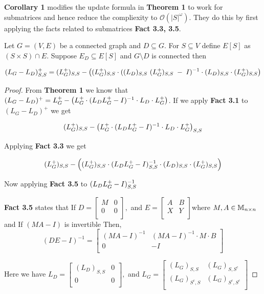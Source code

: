 \textbf{Corollary 1} modifies the update formula in \textbf{Theorem 1} to work for submatrices and hence reduce the compliexity to $\mathcal{O}(|S|^{\omega})$. They do this by first applying the facts related to submatrices \textbf{Fact 3.3, 3.5}. 
\begin{HXc}
  Let $G=(V,E)$ be a connected graph and $D \subseteq G$. For $S \subseteq V$ define $ E[S] $ as $(S \times S) \cap E$. Suppose $E_D \subseteq E[S]$ and  $G \setminus D$ is connected then 
  
  $$ (L_G - L_D)_{S,S}^+ = (L_{G}^{+})_{S,S} - \left( (L_{G}^{+})_{S,S} \cdot ((L_D)_{S,S} \  (L_{G}^{+})_{S,S} \; - \; I)^{-1} \cdot (L_D)_{S,S} \cdot (L_{G}^{+})_{S,S} \right) $$ 
  
\end{HXc}
\begin{proof}
From \textbf{Theorem 1} we know that $(L_G - L_D)^+ = L_{G}^{+} - \left( L_{G}^{+} \cdot (L_DL_{G}^{+}-I)^{-1} \cdot L_D \cdot L_{G}^{+}\right)$. If we apply \textbf{Fact 3.1} to $(L_G - L_D)^+$ we get 

$$ (L_{G}^{+})_{S,S} - \left( L_{G}^{+} \cdot (L_DL_{G}^{+}-I)^{-1} \cdot L_D \cdot L_{G}^{+} \right)_{S,S} $$

Applying \textbf{Fact 3.3} we get 

$$(L_{G}^{+})_{S,S} - \left( (L_{G}^{+})_{S,S} \cdot (L_DL_{G}^{+}-I)^{-1}_{S,S} \cdot (L_D)_{S,S} \cdot (L_{G}^{+})_{S,S} \right) $$

Now applying \textbf{Fact 3.5} to $(L_DL_{G}^{+}-I)^{-1}_{S,S}$ 

\textbf{Fact 3.5} states that If 
$D = 
\begin{bmatrix}
M & 0 \\
0 & 0 \\
\end{bmatrix},
$ 
and $
E = 
\begin{bmatrix}
A & B \\
X & Y \\
\end{bmatrix}
$where $M, A \in \mathbb{M}_{n \times n}$ and If $(MA - I)$ is invertible Then,
$$ (DE - I)^{-1} = \begin{bmatrix}
(MA - I)^{-1} & (MA - I)^{-1} \cdot M \cdot B \\
0 & -I \\
\end{bmatrix}
$$

Here we have $L_D = 
\begin{bmatrix}
(L_D)_{S,S} & 0 \\
0 & 0 \\
\end{bmatrix},
$ 
and $
L_G = 
\begin{bmatrix}
(L_G)_{S,S} & (L_G)_{S,S^c} \\
(L_G)_{S^c,S} & (L_G)_{S^c,S^c} \\
\end{bmatrix}
$


\end{proof}
